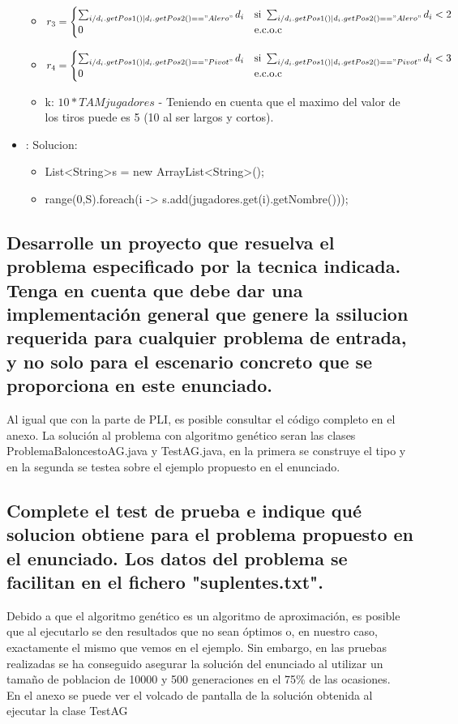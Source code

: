 \documentclass[a4paper,12pt]{article}
\begin{document}
\begin{itemize}
\begin{itemize}
    \item $r_3 =
    \begin{cases}
    \sum_{i / d_i.getPos1()|d_i.getPos2()=="Alero"}{d_i}  &\mbox{si } \sum_{i / d_i.getPos1()|d_i.getPos2()=="Alero"}{d_i} < 2
    \\
    0 &\mbox{e.c.o.c}
    \end{cases}
    $

    \item $r_4 =
    \begin{cases}
    \sum_{i / d_i.getPos1()|d_i.getPos2()=="Pivot"}{d_i} &\mbox{si } \sum_{i / d_i.getPos1()|d_i.getPos2()=="Pivot"}{d_i} < 3
    \\
    0 &\mbox{e.c.o.c}
    \end{cases}
    $

    \item k: $10*TAMjugadores$ - Teniendo en cuenta que el maximo del valor de los
    tiros puede es 5 (10 al ser largos y cortos).
  \end{itemize}
  \item: Solucion:
  \begin{itemize}
    \item List\textless String\textgreater s = new ArrayList\textless String\textgreater();
    \item range(0,S).foreach(i -> s.add(jugadores.get(i).getNombre()));
  \end{itemize}
\end{itemize}



\subsection{Desarrolle un proyecto que resuelva el problema especificado por la tecnica indicada. Tenga en cuenta que debe dar una implementación general que genere la ssilucion requerida para cualquier problema de entrada, y no solo para el escenario concreto que se proporciona en este enunciado.}
Al igual que con la parte de PLI, es posible consultar el código completo en el anexo. La solución al problema con algoritmo genético seran las clases ProblemaBaloncestoAG.java y TestAG.java, en la primera se construye el tipo y en la segunda se testea sobre el ejemplo propuesto en el enunciado.
\subsection{Complete el test de prueba e indique qué solucion obtiene para el problema propuesto en el enunciado. Los datos del problema se facilitan en el fichero "suplentes.txt".}
Debido a que el algoritmo genético es un algoritmo de aproximación, es posible que al ejecutarlo
se den resultados que no sean óptimos o, en nuestro caso, exactamente el mismo que vemos en el ejemplo.
Sin embargo, en las pruebas realizadas se ha conseguido asegurar la solución del enunciado al utilizar
un tamaño de poblacion de 10000 y 500 generaciones en el 75\% de las ocasiones.\\
En el anexo se puede ver el volcado de pantalla de la solución obtenida al ejecutar la clase TestAG
\end{document}
